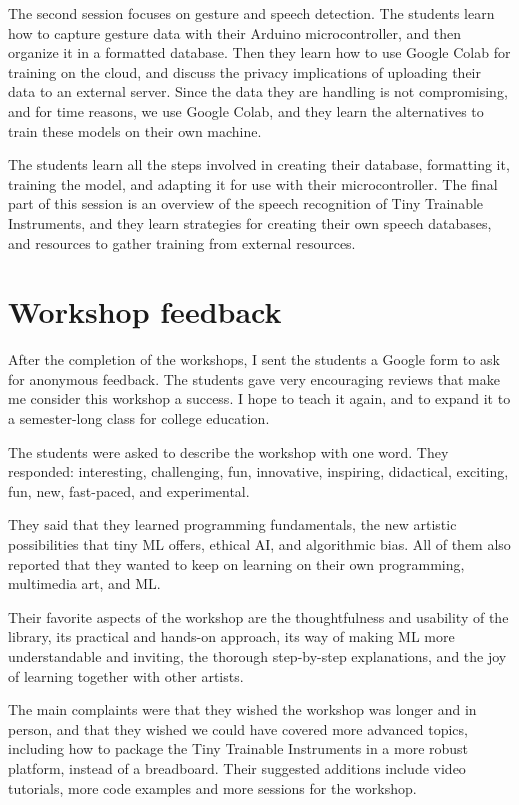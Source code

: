 The second session focuses on gesture and speech detection. The students learn how to capture gesture data with their Arduino microcontroller, and then organize it in a formatted database. Then they learn how to use Google Colab for training on the cloud, and discuss the privacy implications of uploading their data to an external server. Since the data they are handling is not compromising, and for time reasons, we use Google Colab, and they learn the alternatives to train these models on their own machine.

The students learn all the steps involved in creating their database, formatting it, training the model, and adapting it for use with their microcontroller. The final part of this session is an overview of the speech recognition of Tiny Trainable Instruments, and they learn strategies for creating their own speech databases, and resources to gather training from external resources.

\section{Workshop feedback}

After the completion of the workshops, I sent the students a Google form to ask for anonymous feedback. The students gave very encouraging reviews that make me consider this workshop a success. I hope to teach it again, and to expand it to a semester-long class for college education. 

The students were asked to describe the workshop with one word. They responded: interesting, challenging, fun, innovative, inspiring, didactical, exciting, fun, new, fast-paced, and experimental.

They said that they learned programming fundamentals, the new artistic possibilities that tiny \acrshort{ML} offers, ethical \acrshort{AI}, and algorithmic bias. All of them also reported that they wanted to keep on learning on their own programming, multimedia art, and \acrshort{ML}.

Their favorite aspects of the workshop are the thoughtfulness and usability of the library, its practical and hands-on approach, its way of making \acrshort{ML} more understandable and inviting, the thorough step-by-step explanations, and the joy of learning together with other artists.

The main complaints were that they wished the workshop was longer and in person, and that they wished we could have covered more advanced topics, including how to package the Tiny Trainable Instruments in a more robust platform, instead of a breadboard. Their suggested additions include video tutorials, more code examples and more sessions for the workshop.


